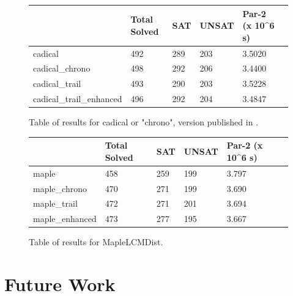 \documentclass[runningheads]{llncs}
\begin{document}
\begin{figure}
    \begin{tabular}{|l|l|l|l|l|l|}
      \hline
      & Total Solved & SAT & UNSAT & Par-2 (x 10\textasciicircum{}6 s) \\ \hline
      cadical                  & 492          & 289 &  203  & 3.5020                            \\ \hline
      cadical\_chrono          & 498          & 292 &  206  & 3.4400                            \\ \hline
      cadical\_trail           & 493          & 290 &  203  & 3.5228                            \\ \hline
      cadical\_trail\_enhanced & 496          & 292 &  204  & 3.4847                            \\ \hline
    \end{tabular}
    \caption{Table of results for cadical or "chrono", version published in \cite{DBLP:conf/sat/MohleB19}.}
\end{figure}

\begin{figure}
    \begin{tabular}{|l|l|l|l|l|l|}
      \hline
      & Total Solved & SAT & UNSAT & Par-2 (x 10\textasciicircum{}6 s) \\ \hline
      maple           & 458          & 259 &  199  & 3.797                             \\ \hline
      maple\_chrono   & 470          & 271 &  199  & 3.690                             \\ \hline
      maple\_trail    & 472          & 271 &  201  & 3.694                             \\ \hline
      maple\_enhanced & 473          & 277 &  195  & 3.667                             \\ \hline
    \end{tabular}
    \caption{Table of results for MapleLCMDist.}
\end{figure}
\clearpage

\section{Future Work}
\end{document}
